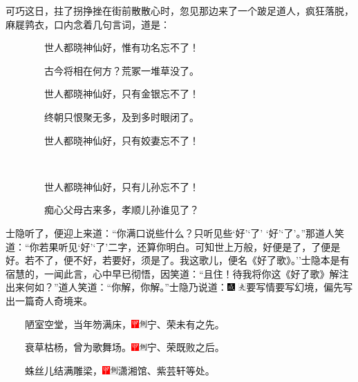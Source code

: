 可巧这日，拄了拐挣挫在街前散散心时，忽见那边来了一个跛足道人，疯狂落脱，麻屣鹑衣，口内念着几句言词，道是：

　　　　世人都晓神仙好，惟有功名忘不了！

　　　　古今将相在何方？荒冢一堆草没了。

　　　　世人都晓神仙好，只有金银忘不了！

　　　　终朝只恨聚无多，及到多时眼闭了。

　　　　世人都晓神仙好，只有姣妻忘不了！


　　　　世人都晓神仙好，只有儿孙忘不了！

　　　　痴心父母古来多，孝顺儿孙谁见了？

士隐听了，便迎上来道：``你满口说些什么？只听见些`好'`了'
`好'`了'。''那道人笑道：``你若果听见`好'`了'二字，还算你明白。可知世上万般，好便是了，了便是好。若不了，便不好，若要好，须是了。我这歌儿，便名《好了歌》。''士隐本是有宿慧的，一闻此言，心中早已彻悟，因笑道：``且住！待我将你这《好了歌》解注出来何如？''道人笑道：``你解，你解。''士隐乃说道：{\includegraphics[width=3mm]{../Images/00005} \includegraphics[width=3mm]{../Images/00012}\footnotesize   要写情要写幻境，偏先写出一篇奇人奇境来。}

　　陋室空堂，当年笏满床，{\includegraphics[width=3mm]{../Images/00002}\includegraphics[width=3mm]{../Images/00011}\footnotesize 宁、荣未有之先。}

　　衰草枯杨，曾为歌舞场。{\includegraphics[width=3mm]{../Images/00002}\includegraphics[width=3mm]{../Images/00011}\footnotesize 宁、荣既败之后。}

　　蛛丝儿结满雕梁，{\includegraphics[width=3mm]{../Images/00002}\includegraphics[width=3mm]{../Images/00011}\footnotesize 潇湘馆、紫芸轩等处。}

